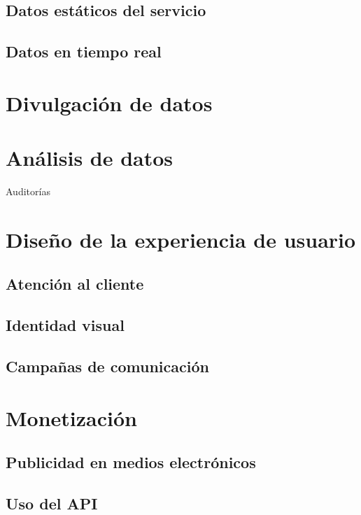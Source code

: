 \documentclass{report}
\begin{document}
\subsection{Datos estáticos del servicio}

\subsection{Datos en tiempo real}

\section{Divulgación de datos}



\section{Análisis de datos}

Auditorías

\section{Diseño de la experiencia de usuario}
\label{S:experiencia}

\subsection{Atención al cliente}

\subsection{Identidad visual}

\subsection{Campañas de comunicación}

\section{Monetización}
\label{S:monetizacion}

\subsection{Publicidad en medios electrónicos}

\subsection{Uso del API}
\end{document}
